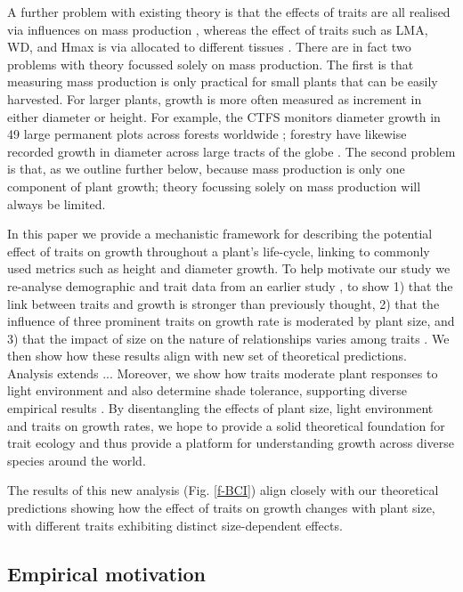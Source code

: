 \documentclass[12pt, a4paper]{article}
\begin{document}
A further problem with existing theory is that the effects of traits are all
realised via influences on mass production \citep{enquist-2007},
whereas the effect of traits such as LMA, WD, and Hmax is via allocated
to different tissues \citep{falster-2011}. There are in fact two problems with theory
focussed solely on mass production. The first is that measuring mass
production is only practical for small plants that can be easily harvested.
For larger plants, growth is more often measured as increment in either diameter
or height. For example, the CTFS monitors diameter growth in 49 large permanent
plots across forests worldwide \citep{anderson-teixeira-2015};
 forestry have likewise recorded growth in diameter across
large tracts of the globe \citep{purves-2008}. The second problem is
that, as we outline further below, because mass production is only one
component of plant growth; theory focussing solely on mass production will
 always be limited.

In this paper we provide a mechanistic framework for describing the potential
effect of traits on growth throughout a plant's life-cycle, linking to
commonly used metrics such as height and diameter growth. To help motivate our
study we re-analyse demographic and trait data from an earlier study
 \citep{wright-2010}, to show 1) that the link between traits and
growth is stronger than previously thought, 2) that the influence of three
prominent traits on growth rate is moderated by plant size, and 3) that the
impact of size on the nature of relationships varies among traits
 \citep[see also]{ruger-2012}. We then show how these results align with new
set of theoretical predictions. Analysis extends ...
Moreover, we show how traits moderate plant
responses to light environment and also determine shade tolerance, supporting
diverse empirical results \citep{ruger-2012, poorter-2006}. By
disentangling the effects of plant size, light environment and traits on
growth rates, we hope to provide a solid theoretical foundation for trait
ecology and thus provide a platform for understanding growth across diverse
species around the world.


The results of this new analysis
(Fig. \ref{f-BCI}) align closely with our theoretical predictions  showing how the effect of traits on growth
changes with plant size, with different traits exhibiting distinct
size-dependent effects.



\subsection{Empirical motivation}\label{fresh-empirical-motivation}
\end{document}
